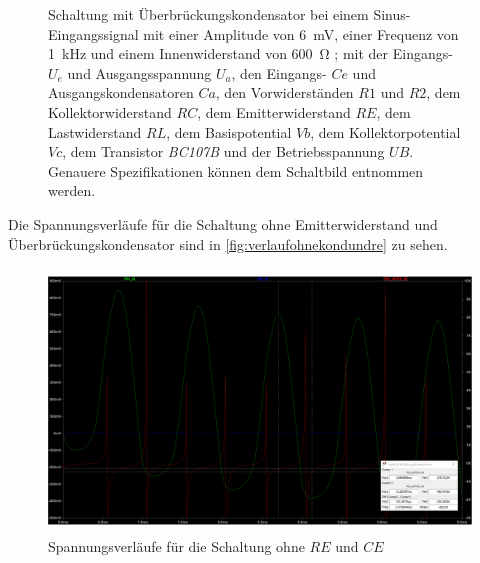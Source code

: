 \documentclass[12pt,english,ngerman]{scrartcl}
\begin{document}
\begin{figure}[H]
    \centering
    \caption{Schaltung mit Überbrückungskondensator bei einem Sinus-Eingangssignal
      mit einer Amplitude von \SI{6}{\milli\volt}, einer Frequenz von \SI{1}{\kilo\hertz} und einem
      Innenwiderstand von \SI{600}{\ohm} ; mit der Eingangs- $U_e$ und
      Ausgangsspannung $U_a$, den Eingangs- $Ce$ und Ausgangskondensatoren $Ca$, den
      Vorwiderständen $R1$ und $R2$, dem Kollektorwiderstand $RC$, dem
      Emitterwiderstand $RE$, dem Lastwiderstand $RL$, dem Basispotential $Vb$, dem
      Kollektorpotential $Vc$, dem Transistor \textit{BC107B} und der
      Betriebsspannung $UB$. Genauere Spezifikationen können dem Schaltbild entnommen
      werden.}
    \label{fig:schatlungohnekundre}
\end{figure}

Die Spannungsverläufe für die Schaltung ohne Emitterwiderstand und
Überbrückungskondensator sind in \autoref{fig:verlaufohnekondundre} zu
sehen.
\begin{figure}
  \centering
  \includegraphics[width=\linewidth, height=7cm]{./figures/ohnekondundre/verstaerkung5mv.png}
  \caption{Spannungsverläufe für die Schaltung ohne $RE$ und $CE$}
  \label{fig:verlaufohnekondundre}
\end{figure}
\end{document}
